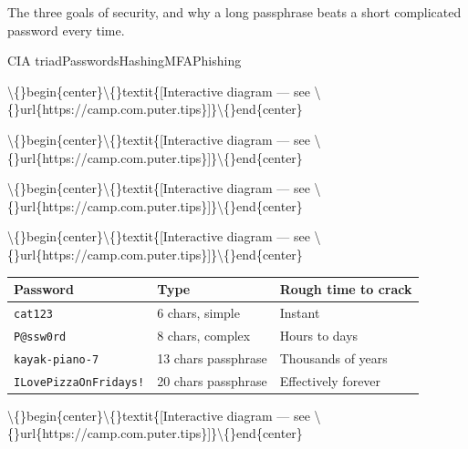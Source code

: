 \documentclass[12pt,openany]{book}
\begin{document}
The three goals of security, and why a long passphrase beats a short complicated password every time.


CIA triadPasswordsHashingMFAPhishing











\textbackslash\{\}begin\{center\}\textbackslash\{\}textit\{[Interactive diagram --- see \textbackslash\{\}url\{https://camp.com.puter.tips\}]\}\textbackslash\{\}end\{center\}





\textbackslash\{\}begin\{center\}\textbackslash\{\}textit\{[Interactive diagram --- see \textbackslash\{\}url\{https://camp.com.puter.tips\}]\}\textbackslash\{\}end\{center\}



\textbackslash\{\}begin\{center\}\textbackslash\{\}textit\{[Interactive diagram --- see \textbackslash\{\}url\{https://camp.com.puter.tips\}]\}\textbackslash\{\}end\{center\}



\textbackslash\{\}begin\{center\}\textbackslash\{\}textit\{[Interactive diagram --- see \textbackslash\{\}url\{https://camp.com.puter.tips\}]\}\textbackslash\{\}end\{center\}



\begin{center}\small\begin{tabular}{p{4.3cm}p{4.3cm}p{4.3cm}}\toprule
\textbf{Password} & \textbf{Type} & \textbf{Rough time to crack} \\ \midrule
\texttt{cat123} & 6 chars, simple & Instant \\
\texttt{P@ssw0rd} & 8 chars, complex & Hours to days \\
\texttt{kayak-piano-7} & 13 chars passphrase & Thousands of years \\
\texttt{ILovePizzaOnFridays!} & 20 chars passphrase & Effectively forever \\
\bottomrule\end{tabular}\end{center}











\textbackslash\{\}begin\{center\}\textbackslash\{\}textit\{[Interactive diagram --- see \textbackslash\{\}url\{https://camp.com.puter.tips\}]\}\textbackslash\{\}end\{center\}
\end{document}
